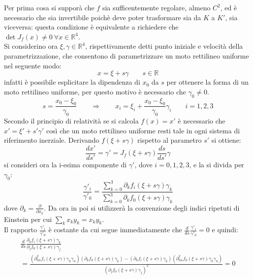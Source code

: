 Per prima cosa si supporà che $f$ sia sufficentemente regolare, almeno $C^2$, ed è necessario che sia invertibile poichè deve poter trasformare sia da $K$ a $K'$, sia viceversa: questa condizione è equivalente a richiedere che $\det J_f(x)\neq 0\ \forall x\in\mathbb{R}^4$.\\

Si considerino ora $\xi, \gamma \in \mathbb{R}^4$, rispettivamente detti punto iniziale e velocità della parametrizzazione, che consentono di parametrizzare un moto rettilineo uniforme nel seguente modo:
\begin{equation*}
    x=\xi+s\gamma \qquad s\in \mathbb{R}
\end{equation*}
infatti è possibile esplicitare la dipendenza di $x_0$ da $s$ per ottenere la forma di un moto rettilineo uniforme, per questo motivo è necessario che $\gamma_0\neq 0$. 
\begin{equation*}
    s=\frac{x_0-\xi_0}{\gamma_0} \qquad \Rightarrow \qquad x_i=\xi_i+\frac{x_0-\xi_0}{\gamma_0}\gamma_i \qquad i=1,2,3
\end{equation*}
Secondo il principio di relatività se si calcola $f(x)=x'$ è necessario che $x'=\xi'+s'\gamma'$ così che un moto rettilineo uniforme resti tale in ogni sistema di riferimento inerziale. Derivando $f(\xi+s\gamma)$ rispetto al parametro $s'$ si ottiene:
\begin{equation*}
    \frac{dx'}{ds'}=\gamma'=J_f(\xi+s\gamma)\frac{ds}{ds'}\gamma
\end{equation*}
si consideri ora la i-esima componente di $\gamma'$, dove $i=0,1,2,3$, e la si divida per $\gamma_0$:
\begin{equation*}
    \frac{\gamma'_i}{\gamma'_0}=\frac{\sum_{k=0}^3\partial_kf_i(\xi+s\gamma)\gamma_k}{\sum_{k=0}^3\partial_kf_0(\xi+s\gamma)\gamma_k}
    \label{ARappGamma}
\end{equation*} 
dove $\partial_k=\frac{\partial}{\partial x_k}$. Da ora in poi si utilizzerà la convenzione degli indici ripetuti di Einstein per cui $\sum_k x_k y_k=x_k y_k$.\\Il rapporto $\frac{\gamma'_i}{\gamma'_0}$ è costante da cui segue immediatamente che $\frac{d}{ds}\frac{\gamma'_i}{\gamma'_0}=0$  e quindi:
\begin{equation*}
    \begin{gathered}
        \frac{d}{ds}\frac{\partial_kf_i(\xi+s\gamma)\gamma_k}{\partial_jf_0(\xi+s\gamma)\gamma_j}\\
    =\frac{\left(\partial^2_{hn}f_i(\xi+s\gamma)\gamma_h\gamma_n\right)\left(\partial_kf_0(\xi+s\gamma)\gamma_k\right)
    - \left(\partial_kf_i(\xi+s\gamma)\gamma_k\right)\left(\partial^2_{hn}f_0(\xi+s\gamma)\gamma_h\gamma_n\right)}{\left(\partial_jf_0(\xi+s\gamma)\gamma_j\right)^2}=0    
\end{gathered}
\end{equation*}

